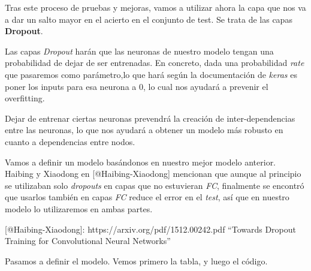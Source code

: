 \documentclass[11pt]{article}
\begin{document}
Tras este proceso de pruebas y mejoras, vamos a utilizar ahora la capa
que nos va a dar un salto mayor en el acierto en el conjunto de test. Se
trata de las capas \textbf{Dropout}.

Las capas \emph{Dropout} harán que las neuronas de nuestro modelo tengan
una probabilidad de dejar de ser entrenadas. En concreto, dada una
probabilidad \emph{rate} que pasaremos como parámetro,lo que hará según
la documentación de \emph{keras} es poner los inputs para esa neurona a
0, lo cual nos ayudará a prevenir el overfitting.

Dejar de entrenar ciertas neuronas prevendrá la creación de
inter-dependencias entre las neuronas, lo que nos ayudará a obtener un
modelo más robusto en cuanto a dependencias entre nodos.

Vamos a definir un modelo basándonos en nuestro mejor modelo anterior.
Haibing y Xiaodong en {[}@Haibing-Xiaodong{]} mencionan que aunque al
principio se utilizaban solo \emph{dropouts} en capas que no estuvieran
\emph{FC}, finalmente se encontró que usarlos también en capas \emph{FC}
reduce el error en el \emph{test}, así que en nuestro modelo lo
utilizaremos en ambas partes.

{[}@Haibing-Xiaodong{]}: https://arxiv.org/pdf/1512.00242.pdf ``Towards
Dropout Training for Convolutional Neural Networks''

Pasamos a definir el modelo. Vemos primero la tabla, y luego el código.
\end{document}
